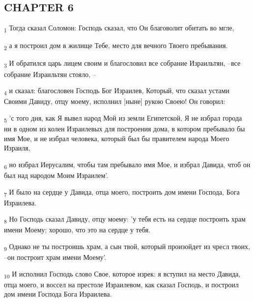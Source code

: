 \subsection{CHAPTER 6}
\begin{tcolorbox}
\textsubscript{1} Тогда сказал Соломон: Господь сказал, что Он благоволит обитать во мгле,
\end{tcolorbox}
\begin{tcolorbox}
\textsubscript{2} а я построил дом в жилище Тебе, место для вечного Твоего пребывания.
\end{tcolorbox}
\begin{tcolorbox}
\textsubscript{3} И обратился царь лицем своим и благословил все собрание Израильтян, --все собрание Израильтян стояло, --
\end{tcolorbox}
\begin{tcolorbox}
\textsubscript{4} и сказал: благословен Господь Бог Израилев, Который, что сказал устами Своими Давиду, отцу моему, исполнил [ныне] рукою Своею! Он говорил:
\end{tcolorbox}
\begin{tcolorbox}
\textsubscript{5} 'с того дня, как Я вывел народ Мой из земли Египетской, Я не избрал города ни в одном из колен Израилевых для построения дома, в котором пребывало бы имя Мое, и не избрал человека, который был бы правителем народа Моего Израиля,
\end{tcolorbox}
\begin{tcolorbox}
\textsubscript{6} но избрал Иерусалим, чтобы там пребывало имя Мое, и избрал Давида, чтоб он был над народом Моим Израилем'.
\end{tcolorbox}
\begin{tcolorbox}
\textsubscript{7} И было на сердце у Давида, отца моего, построить дом имени Господа, Бога Израилева.
\end{tcolorbox}
\begin{tcolorbox}
\textsubscript{8} Но Господь сказал Давиду, отцу моему: 'у тебя есть на сердце построить храм имени Моему; хорошо, что это на сердце у тебя.
\end{tcolorbox}
\begin{tcolorbox}
\textsubscript{9} Однако не ты построишь храм, а сын твой, который произойдет из чресл твоих, --он построит храм имени Моему'.
\end{tcolorbox}
\begin{tcolorbox}
\textsubscript{10} И исполнил Господь слово Свое, которое изрек: я вступил на место Давида, отца моего, и воссел на престоле Израилевом, как сказал Господь, и построил дом имени Господа Бога Израилева.
\end{tcolorbox}

